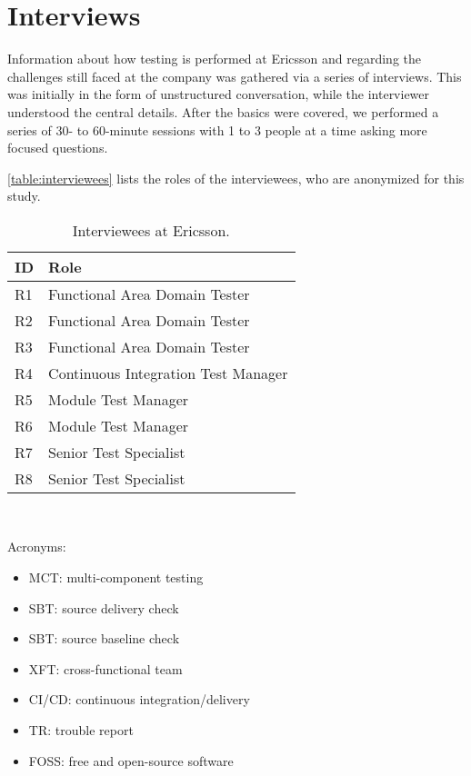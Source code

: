 \section{Interviews}
\label{sec:ind_interviews}


Information about how testing is performed at Ericsson and regarding the challenges still faced at the company was gathered via a series of interviews.
This was initially in the form of unstructured conversation, while the interviewer understood the central details.
After the basics were covered, we performed a series of 30- to 60-minute sessions with 1 to 3 people at a time asking more focused questions.

\autoref{table:interviewees} lists the roles of the interviewees, who are anonymized for this study.

\begin{table}[]
\centering
{}
\begin{tabular}{ll}
\toprule
\textbf{ID} & \textbf{Role} \\
\midrule
R1 & Functional Area Domain Tester \\
R2 & Functional Area Domain Tester \\
R3 & Functional Area Domain Tester \\
R4 & Continuous Integration Test Manager \\
R5 & Module Test Manager \\
R6 & Module Test Manager \\
R7 & Senior Test Specialist \\
R8 & Senior Test Specialist \\
\bottomrule
\end{tabular}\\
\caption{Interviewees at Ericsson.}
\label{table:interviewees}
\end{table}

Acronyms:
\begin{itemize}
	\item MCT: multi-component testing
	\item SBT: source delivery check
	\item SBT: source baseline check
	\item XFT: cross-functional team
	\item CI/CD: continuous integration/delivery
	\item TR: trouble report
	\item FOSS: free and open-source software
\end{itemize}

